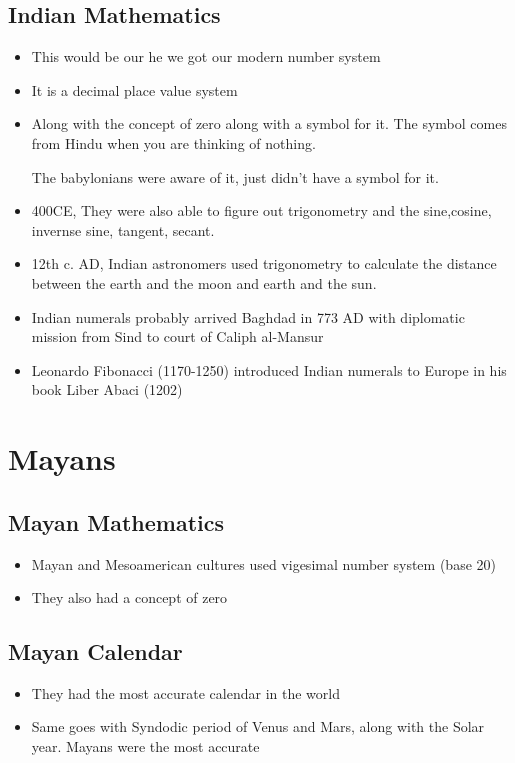 \documentclass{article}
\begin{document}
\subsection{Indian Mathematics}
\begin{itemize}
  \item This would be our he we got our modern number system
  \item It is a decimal place value system
  \item Along with the concept of zero along with a symbol for it.
    The symbol comes from Hindu when you are thinking of nothing.

    The babylonians were aware of it, just didn't have a symbol for it.
  \item 400CE, They were also able to figure out trigonometry
    and the sine,cosine, invernse sine, tangent, secant.
  \item 12th c. AD, Indian astronomers used trigonometry to calculate the
    distance between the earth and the moon and earth and the sun.
  \item Indian numerals probably arrived Baghdad in 773 AD with
    diplomatic mission from Sind to court of Caliph al-Mansur
  \item Leonardo Fibonacci (1170-1250) introduced Indian numerals to Europe
    in his book Liber Abaci (1202)
\end{itemize}

\section{Mayans}
\subsection{Mayan Mathematics}
\begin{itemize}
  \item Mayan and Mesoamerican cultures used vigesimal number system (base 20)
  \item They also had a concept of zero
\end{itemize}

\subsection{Mayan Calendar}
\begin{itemize}
  \item They had the most accurate calendar in the world
  \item Same goes with Syndodic period of Venus and Mars, along
    with the Solar year. Mayans were the most accurate

\end{itemize}
\end{document}
